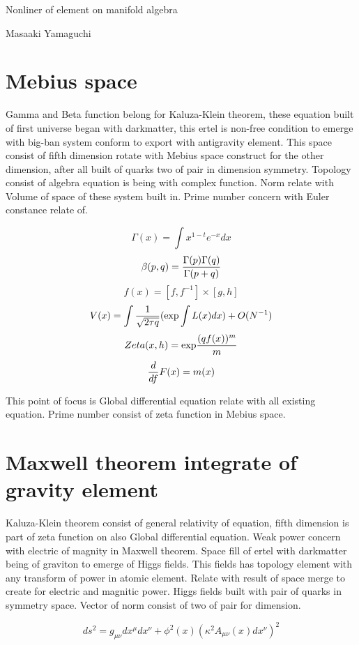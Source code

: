 \documentclass{jsarticle}
\begin{document}
\newpage
\begin{center}
\large	Nonliner of element on manifold algebra
\end{center}
\begin{center}
	Masaaki Yamaguchi
\end{center}




\section{Mebius space}

  Gamma and Beta function belong for Kaluza-Klein theorem, these equation built of first universe
began with darkmatter, this ertel is non-free condition to emerge with big-ban system conform to
export with antigravity element. This space consist of fifth dimension rotate with Mebius space
construct for the other dimension, after all built of quarks two of pair in dimension symmetry.
Topology consist of algebra equation is being with complex function. Norm relate with Volume of space
of these system built in. Prime number concern with Euler constance relate of.

$$ \Gamma(x) = \int x^{1-t}e^{-x}dx $$
$$ \beta(p,q) = {\Gamma(p)\Gamma(q) \over \Gamma(p + q)} $$
$$ f(x) = [f, f^{-1}] \times [g, h] $$
$$ V(x) = \int {1 \over \sqrt{2\tau q}} (\mathrm{exp} \int L(x)dx) + O(N^{-1}) $$
$$ Zeta(x,h) = \mathrm{exp}{(qf(x))^m \over m} $$
$$ {d \over df}F(x) = m(x) $$

  This point of focus is Global differential equation relate with all existing equation.
Prime number consist of zeta function in Mebius space.

\section{Maxwell theorem integrate of gravity element}

  Kaluza-Klein theorem consist of general relativity of equation, fifth dimension is part of zeta function
on also Global differential equation. Weak power concern with electric of magnity in Maxwell theorem. Space
fill of ertel with darkmatter being of graviton to emerge of Higgs fields. This fields has topology element
with any transform of power in atomic element. Relate with result of space merge to create for electric and 
magnitic power. Higgs fields built with pair of quarks in symmetry space.
Vector of norm consist of two of pair for dimension.

$$ ds^2 = g_{\mu\nu}dx^{\mu}dx^{\nu} + \phi^2(x)(\kappa^2 A_{\mu\nu}(x)dx^{\nu})^2 $$
\end{document}
